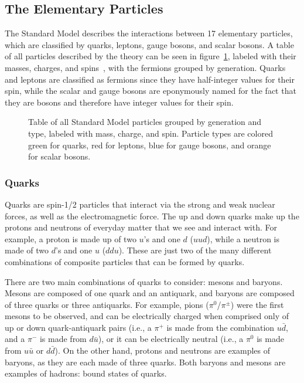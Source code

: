 \subsection{The Elementary Particles}
\label{subsec:particles}

The Standard Model describes the interactions between 17 elementary particles, which are classified by quarks, leptons, gauge bosons, and scalar bosons.
A table of all particles described by the theory can be seen in figure~\ref{fig:standardModel}, labeled with their masses, charges, and spins~\cite{PhysRevD.98.030001}, with the fermions grouped by generation.
Quarks and leptons are classified as fermions since they have half-integer values for their spin, while the scalar and gauge bosons are eponymously named for the fact that they are bosons and therefore have integer values for their spin. %

\begin{figure}[htbp]
  \centering
  
  \caption{
    Table of all Standard Model particles grouped by generation and type, labeled with mass, charge, and spin.
    Particle types are colored green for quarks, red for leptons, blue for gauge bosons, and orange for scalar bosons.
  }
  \label{fig:standardModel}
\end{figure}

\subsubsection{Quarks}

Quarks are spin-1/2 particles that interact via the strong and weak nuclear forces, as well as the electromagnetic force.
The up and down quarks make up the protons and neutrons of everyday matter that we see and interact with.
For example, a proton is made up of two $u$'s and one $d$ ($uud$), while a neutron is made of two $d$'s and one $u$ ($ddu$).
These are just two of the many different combinations of composite particles that can be formed by quarks.

There are two main combinations of quarks to consider: mesons and baryons.
Mesons are composed of one quark and an antiquark, and baryons are composed of three quarks or three antiquarks. %
For example, pions ($\pi^0$/$\pi^\pm$) were the first mesons to be observed, and can be electrically charged when comprised only of up or down quark-antiquark pairs (i.e., a $\pi^+$ is made from the combination $u\bar{d}$, and a $\pi^-$ is made from $d\bar{u}$), or it can be electrically neutral (i.e., a $\pi^0$ is made from $u\bar{u}$ or $d\bar{d}$).
On the other hand, protons and neutrons are examples of baryons, as they are each made of three quarks.
Both baryons and mesons are examples of hadrons: bound states of quarks.

